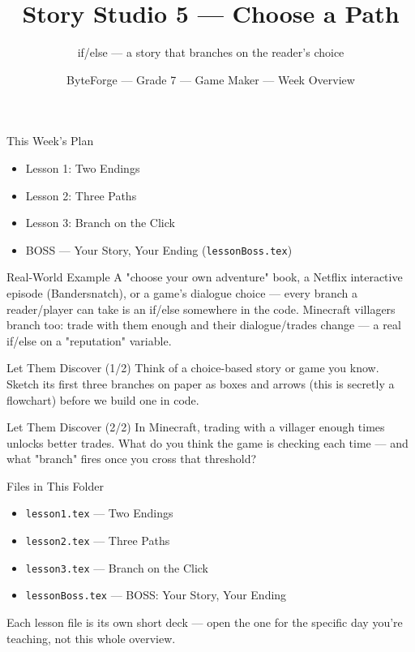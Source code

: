 \documentclass[aspectratio=169]{beamer}
\title{Story Studio 5 — Choose a Path}
\subtitle{if/else — a story that branches on the reader's choice}
\author{ByteForge --- Grade 7 --- Game Maker --- Week Overview}
\date{}
\begin{document}
\begin{frame}
    \titlepage
\end{frame}

\begin{frame}{This Week's Plan}
    \begin{itemize}
        \item Lesson 1: Two Endings
        \item Lesson 2: Three Paths
        \item Lesson 3: Branch on the Click
        \item[$\bigstar$] BOSS --- Your Story, Your Ending (\texttt{lessonBoss.tex})
    \end{itemize}
\end{frame}

\begin{frame}{Real-World Example}
    \Large
    A "choose your own adventure" book, a Netflix interactive episode (Bandersnatch), or a game's dialogue choice — every branch a reader/player can take is an if/else somewhere in the code. Minecraft villagers branch too: trade with them enough and their dialogue/trades change — a real if/else on a "reputation" variable.
\end{frame}


\begin{frame}{Let Them Discover (1/2)}
    \Large
    Think of a choice-based story or game you know. Sketch its first three branches on paper as boxes and arrows (this is secretly a flowchart) before we build one in code.
\end{frame}


\begin{frame}{Let Them Discover (2/2)}
    \Large
    In Minecraft, trading with a villager enough times unlocks better trades. What do you think the game is checking each time — and what "branch" fires once you cross that threshold?
\end{frame}

\begin{frame}{Files in This Folder}
    \small
    \begin{itemize}
        \item \texttt{lesson1.tex} --- Two Endings
        \item \texttt{lesson2.tex} --- Three Paths
        \item \texttt{lesson3.tex} --- Branch on the Click
        \item \texttt{lessonBoss.tex} --- BOSS: Your Story, Your Ending
    \end{itemize}
    \vspace{0.5em}
    \normalsize Each lesson file is its own short deck --- open the one for
    the specific day you're teaching, not this whole overview.
\end{frame}
\end{document}
